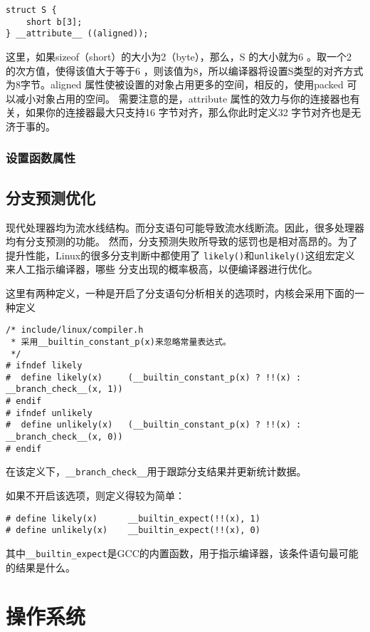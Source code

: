 \begin{verbatim}
struct S {
	short b[3];
} __attribute__ ((aligned));
\end{verbatim}

			这里，如果sizeof（short）的大小为2（byte），那么，S 的大小就为6 。取一个2 的次方值，使得该值大于等于6 ，则该值为8，所以编译器将设置S类型的对齐方式为8字节。aligned 属性使被设置的对象占用更多的空间，相反的，使用packed 可以减小对象占用的空间。
			需要注意的是，attribute 属性的效力与你的连接器也有关，如果你的连接器最大只支持16 字节对齐，那么你此时定义32 字节对齐也是无济于事的。

			\subsubsection{设置函数属性}
	\subsection{分支预测优化}

		现代处理器均为流水线结构。而分支语句可能导致流水线断流。因此，很多处理器均有分支预测的功能。
然而，分支预测失败所导致的惩罚也是相对高昂的。为了提升性能，Linux的很多分支判断中都使用了
\texttt{likely()}和\texttt{unlikely()}这组宏定义来人工指示编译器，哪些
分支出现的概率极高，以便编译器进行优化。

		这里有两种定义，一种是开启了分支语句分析相关的选项时，内核会采用下面的一种定义
\begin{verbatim}
/* include/linux/compiler.h
 * 采用__builtin_constant_p(x)来忽略常量表达式。
 */
# ifndef likely
#  define likely(x)     (__builtin_constant_p(x) ? !!(x) : __branch_check__(x, 1))
# endif
# ifndef unlikely
#  define unlikely(x)   (__builtin_constant_p(x) ? !!(x) : __branch_check__(x, 0))
# endif
\end{verbatim}

		在该定义下，\texttt{__branch_check__}用于跟踪分支结果并更新统计数据。

		如果不开启该选项，则定义得较为简单：
\begin{verbatim}
# define likely(x)      __builtin_expect(!!(x), 1)
# define unlikely(x)    __builtin_expect(!!(x), 0)
\end{verbatim}
其中\texttt{__builtin_expect}是GCC的内置函数，用于指示编译器，该条件语句最可能的结果是什么。

	\section{操作系统}
